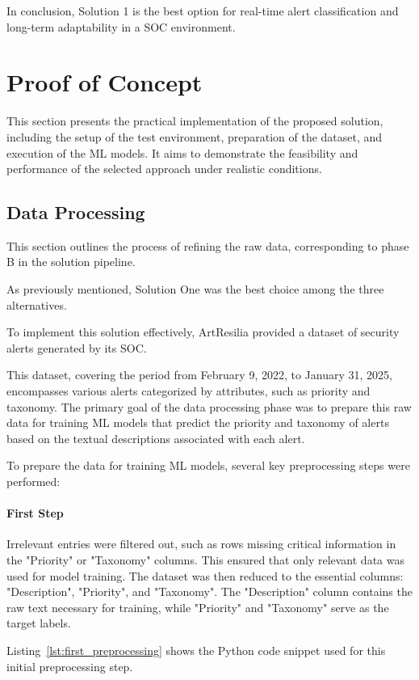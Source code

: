 In conclusion, Solution 1 is the best option for real-time alert classification and long-term adaptability in a SOC environment.

\section{Proof of Concept}
This section presents the practical implementation of the proposed solution, including the setup of the test environment, preparation of the dataset, and execution of the ML models. It aims to demonstrate the feasibility and performance of the selected approach under realistic conditions.

\subsection{Data Processing}
This section outlines the process of refining the raw data, corresponding to phase B in the solution pipeline.

As previously mentioned, Solution One was the best choice among the three alternatives.

To implement this solution effectively, ArtResilia provided a dataset of security alerts generated by its SOC. 

This dataset, covering the period from February 9, 2022, to January 31, 2025, encompasses various alerts categorized by attributes, such as priority and taxonomy. 
The primary goal of the data processing phase was to prepare this raw data for training ML models that predict the priority and taxonomy of alerts based on the textual descriptions associated with each alert.

To prepare the data for training ML models, several key preprocessing steps were performed:

\paragraph{First Step}
Irrelevant entries were filtered out, such as rows missing critical information in the "Priority" or "Taxonomy" columns. 
This ensured that only relevant data was used for model training. 
The dataset was then reduced to the essential columns: "Description", "Priority", and "Taxonomy". 
The "Description" column contains the raw text necessary for training, while "Priority" and "Taxonomy" serve as the target labels.

Listing~\ref{lst:first_preprocessing} shows the Python code snippet used for this initial preprocessing step.

